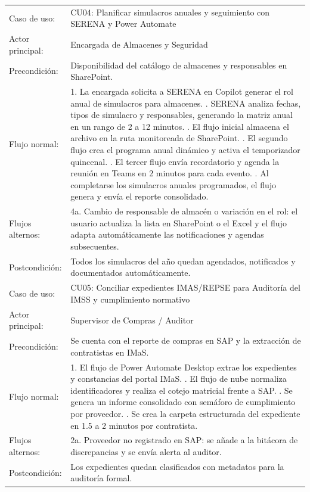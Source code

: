 \begin{longtable}{@{}L{3.2cm}L{12.2cm}@{}}
  \midrule
  Caso de uso: & CU04: Planificar simulacros anuales y seguimiento con SERENA y Power Automate \\
  Actor principal: & Encargada de Almacenes y Seguridad \\
  Precondición: & Disponibilidad del catálogo de almacenes y responsables en SharePoint. \\
  Flujo normal: & 1. La encargada solicita a SERENA en Copilot generar el rol anual de simulacros para almacenes. . SERENA analiza fechas, tipos de simulacro y responsables, generando la matriz anual en un rango de 2 a 12 minutos. . El flujo inicial almacena el archivo en la ruta monitoreada de SharePoint. . El segundo flujo crea el programa anual dinámico y activa el temporizador quincenal. . El tercer flujo envía recordatorio y agenda la reunión en Teams en 2 minutos para cada evento. . Al completarse los simulacros anuales programados, el flujo genera y envía el reporte consolidado. \\
  Flujos alternos: & 4a. Cambio de responsable de almacén o variación en el rol: el usuario actualiza la lista en SharePoint o el Excel y el flujo adapta automáticamente las notificaciones y agendas subsecuentes. \\
  Postcondición: & Todos los simulacros del año quedan agendados, notificados y documentados automáticamente. \\
  \midrule
  Caso de uso: & CU05: Conciliar expedientes IMAS/REPSE para Auditoría del IMSS y cumplimiento normativo \\
  Actor principal: & Supervisor de Compras / Auditor \\
  Precondición: & Se cuenta con el reporte de compras en SAP y la extracción de contratistas en IMaS. \\
  Flujo normal: & 1. El flujo de Power Automate Desktop extrae los expedientes y constancias del portal IMaS. . El flujo de nube normaliza identificadores y realiza el cotejo matricial frente a SAP. . Se genera un informe consolidado con semáforo de cumplimiento por proveedor. . Se crea la carpeta estructurada del expediente en 1.5 a 2 minutos por contratista. \\
  Flujos alternos: & 2a. Proveedor no registrado en SAP: se añade a la bitácora de discrepancias y se envía alerta al auditor. \\
  Postcondición: & Los expedientes quedan clasificados con metadatos para la auditoría formal. \\
\end{longtable}
\endgroup

